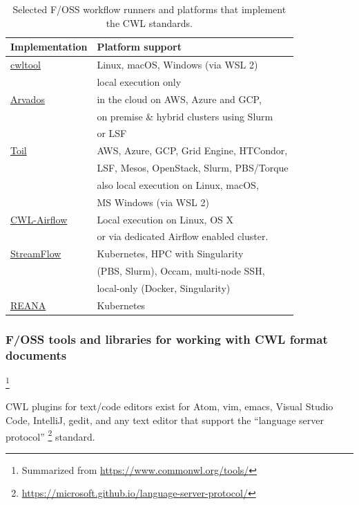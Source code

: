 {\begin{table}
  \caption{Selected F/OSS workflow runners and platforms that implement the CWL standards.}
  \label{tab:runners}
    \begin{tabular}{ll}
      \toprule
      Implementation & Platform support\\
      \midrule
      \href{https://pypi.org/project/cwltool}{cwltool} & Linux, macOS, Windows (via WSL 2) \\
      & local execution only\\
      \href{https://arvados.org}{Arvados} & in the cloud on AWS, Azure and GCP, \\
      & on premise \& hybrid clusters using Slurm \\
      & or LSF\\
      \href{https://pypi.org/project/toil-cwl-runner}{Toil}\cite{vivian2017toil} & AWS, Azure, GCP, Grid Engine, HTCondor, \\
      & LSF, Mesos, OpenStack, Slurm, PBS/Torque\\
      & also local execution on Linux, macOS, \\
      & MS Windows (via WSL 2)\\
      \href{https://pypi.org/project/cwl-airflow}{CWL-Airflow}\cite{kotliar_cwl-airflow_2019} & Local execution on Linux, OS X\\
      & or via dedicated Airflow enabled cluster.\\
      \href{https://streamflow.di.unito.it/}{StreamFlow}\cite{colonnelli_streamflow_2020} & Kubernetes, HPC with Singularity \\
      & (PBS, Slurm), Occam, multi-node SSH, \\
      & local-only (Docker, Singularity)\\
      \href{https://docs.reana.io/}{REANA} & Kubernetes
\end{tabular}
\end{table}

\subsubsection{F/OSS tools and libraries for working with CWL format documents}\footnote{Summarized from \url{https://www.commonwl.org/tools/}}\label{sec:sidebar:b:workwith}

CWL plugins for text/code editors exist for Atom, vim, emacs, Visual Studio Code, IntelliJ, gedit, and any text editor that support the ``language server protocol'' \footnote{\url{https://microsoft.github.io/language-server-protocol/}} standard.

}
